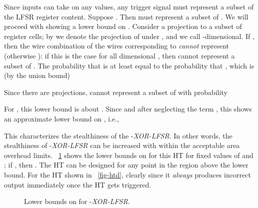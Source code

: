 \documentclass[10pt,journal,compsoc]{IEEEtran}
\begin{document}
Since inputs  can take on any values, any trigger signal  must represent a subset of the LFSR register content. Suppose . Then  must represent a subset of .
We will proceed with showing a lower bound on .
Consider a projection  to a subset of  register cells; by  we denote the projection of  under , and we call  -dimensional. If , then the wire combination of the   wires corresponding to  {\em cannot} represent  (otherwise ): if this is the case for all  dimensional , then  cannot represent a subset of . The probability that   is at least equal to the probability that , which is (by the union bound) 

\vspace{-6pt}

Since there are  projections,  cannot represent a subset of  with probability 

For ,  this lower bound is about .
Since  and after neglecting the term , this shows an approximate lower bound on , i.e.,


This characterizes the stealthiness of the -\textit{XOR-LFSR}.
In other words, the stealthiness of -\textit{XOR-LFSR} can be increased with  within the acceptable area overhead limits.
\figurename~\ref{fig:d_bound_XORLFSR} shows the lower bounds on  for this HT for fixed values of  and ; if , then .
The HT can be designed for any point in the region above the lower bound.
For the HT shown in \figurename~\ref{fig-htd}, clearly  since it \textit{always} produces incorrect output immediately once the HT gets triggered.

\begin{figure}[!t]
\centering
{}
\hfil
{}
\caption{Lower bounds on  for -\textit{XOR-LFSR}.}
\label{fig:d_bound_XORLFSR}
\end{figure}
\end{document}
